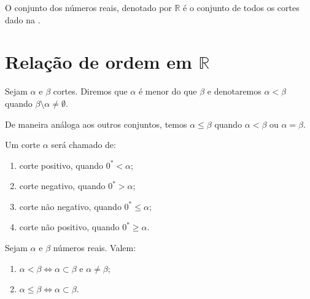 \documentclass[../main.tex]{subfiles}
\begin{document}
\begin{defi}
    O conjunto dos números reais, denotado por $\mathbb{R}$ é o conjunto de todos os cortes dado na .
\end{defi}

\section{Relação de ordem em $\mathbb{R}$}

\begin{defi}\label{reais-def-relacaoOrdem}
    Sejam $\alpha$ e $\beta$ cortes. Diremos que $\alpha$ é menor do que $\beta$ e denotaremos $\alpha < \beta$ quando $\beta \setminus \alpha \neq \emptyset$.
\end{defi}
\begin{obs}
    De maneira análoga aos outros conjuntos, temos $\alpha \leq \beta$ quando $\alpha < \beta$ ou $\alpha = \beta$.
\end{obs}
\begin{defi}
    Um corte $\alpha$ será chamado de:
    \begin{enumerate}[label=(\roman*)]
        \item corte positivo, quando $0^* < \alpha$;
        \item corte negativo, quando $0^* > \alpha$;
        \item corte não negativo, quando $0^* \leq \alpha$;
        \item corte não positivo, quando $0^* \geq \alpha$.
    \end{enumerate}
\end{defi}

\begin{teo}\label{reais-teo-subset}
    Sejam $\alpha$ e $\beta$ números reais. Valem:
    \begin{enumerate}[label=(\roman*)]
        \item $\alpha < \beta \iff \alpha \subset \beta$ e $\alpha \neq \beta$;
        \item $\alpha \leq \beta \iff \alpha \subset \beta$.
    \end{enumerate}
\end{teo}
\end{document}
